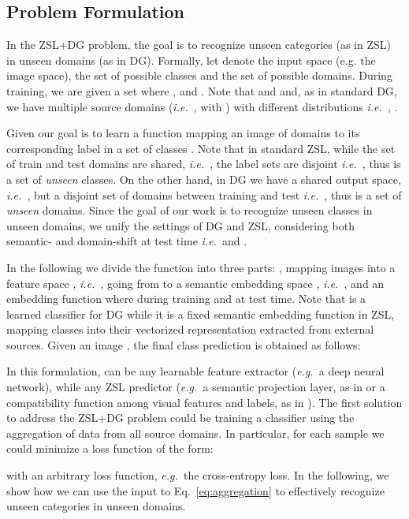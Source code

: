 \documentclass[runningheads]{llncs}
\newcommand{\eg}{\emph{e.g.~}}
\newcommand{\ie}{\emph{i.e.~}}
\begin{document}
\subsection{Problem Formulation}
In the ZSL+DG problem, the goal is to recognize unseen categories (as in ZSL) in unseen domains (as in DG). Formally, let  denote the input space (e.g. the image space),  the set of possible classes and  the set of possible domains. During training, we are given a set   where ,  and . Note that  and  and, as in standard DG, {we have multiple source domains (\ie , with ) with} different distributions \ie , .

Given  our goal is to learn a function  mapping an image  of 
domains  to its corresponding label in a set of 
classes . Note that in standard ZSL, {while the set of train and test domains are shared, \ie }, the label sets are disjoint \ie , {thus  is a set of \textit{unseen} classes. } On the other hand, in DG we have {a shared output space}, \ie , but a disjoint set of domains between training and test \ie , {thus  is a set of \textit{unseen} domains}. Since the goal of our work is to recognize unseen classes in unseen domains, we unify the settings of DG and ZSL, considering both semantic- and domain-shift at test time \ie  and .


In the following we divide the function  into three parts: , mapping images into a feature space , \ie ,  going from  to a semantic embedding space , \ie , and an embedding function {} where  during training and  at test time. Note that  is a learned classifier for DG while it is a fixed semantic embedding function in ZSL, mapping classes into their vectorized representation extracted from external sources.
Given an image , the final class prediction is obtained as follows:

In this formulation,  can be any learnable feature extractor (\eg a deep neural network), while  any ZSL predictor {(\eg a semantic projection layer, as in \cite{xian2019semantic} or a compatibility function among visual features and labels, as in \cite{akata2013label,akata2015evaluation})}. 
The first solution {to address the ZSL+DG problem} could be training a classifier using the aggregation of data from all source domains. In particular, for each sample we could minimize a loss function of the form:

with  an arbitrary loss function, \eg the cross-entropy loss. In the following, we show how we can use the input to Eq.~\eqref{eq:aggregation} to effectively recognize unseen categories in unseen domains.
\end{document}
